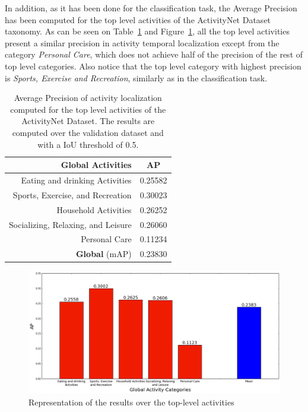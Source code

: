 In addition, as it has been done for the classification task, the Average Precision has been computed for the top level activities of the ActivityNet Dataset taxonomy. As can be seen on Table~\ref{table:top_level_detection_ap} and Figure~\ref{fig:top_level_detection_ap}, all the top level activities present a similar precision in activity temporal localization except from the category \textit{Personal Care}, which does not achieve half of the precision of the rest of top level categories. Also notice that the top level category with highest precision is \textit{Sports, Exercise and Recreation}, similarly as in the classification task.

\begin{table}[H]
\begin{center}
\begin{tabular}{|r|c|}
\hline
\textbf{Global Activities} & \textbf{AP} \\
\hline\hline
Eating and drinking Activities & 0.25582 \\
Sports, Exercise, and Recreation & 0.30023 \\
Household Activities & 0.26252 \\
Socializing, Relaxing, and Leisure & 0.26060 \\
Personal Care & 0.11234 \\
\hline\hline
\textbf{Global} (mAP) & 0.23830 \\
\hline
\end{tabular}
\end{center}
\caption{Average Precision of activity localization computed for the top level activities of the ActivityNet Dataset. The results are computed over the validation dataset and with a IoU threshold of 0.5.}
\label{table:top_level_detection_ap}
\end{table}

\begin{figure}[H]
\begin{center}
\includegraphics[width=1\linewidth]{img/results/top_activities_detection_ap}
\end{center}
\caption{Representation of the results over the top-level activities}
\label{fig:top_level_detection_ap}
\end{figure}


